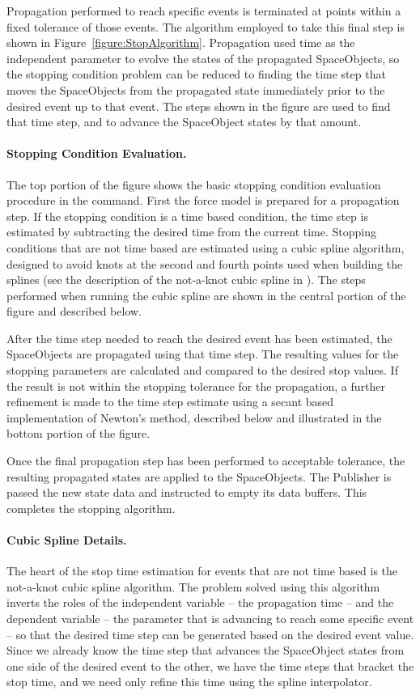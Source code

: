 Propagation performed to reach specific events is terminated at points within a fixed tolerance of
those events.  The algorithm employed to take this final step is shown in
Figure~\ref{figure:StopAlgorithm}.  Propagation used time as the independent parameter to evolve
the states of the propagated SpaceObjects, so the stopping condition problem can be reduced to
finding the time step that moves the SpaceObjects from the propagated state immediately prior to
the desired event up to that event.  The steps shown in the figure are used to find that time
step, and to advance the SpaceObject states by that amount.

\paragraph{Stopping Condition Evaluation.}  The top portion of the figure shows the basic stopping
condition evaluation procedure in the command.  First the force model is prepared for a propagation
step.  If the stopping condition is a time based condition, the time step is estimated by
subtracting the desired time from the current time.  Stopping conditions that are not time based are
estimated using a cubic spline algorithm, designed to avoid knots at the second and fourth points
used when building the splines (see the description of the not-a-knot cubic spline in
\cite{mathSpec}).  The steps performed when running the cubic spline are shown in the central
portion of the figure and described below.

After the time step needed to reach the desired event has been estimated, the SpaceObjects are
propagated using that time step.  The resulting values for the stopping parameters are calculated
and compared to the desired stop values.  If the result is not within the stopping tolerance for
the propagation, a further refinement is made to the time step estimate using a secant based
implementation of Newton's method, described below and illustrated in the bottom portion of the
figure.

Once the final propagation step has been performed to acceptable tolerance, the resulting
propagated states are applied to the SpaceObjects.  The Publisher is passed the new state data and
instructed to empty its data buffers.  This completes the stopping algorithm.

\paragraph{Cubic Spline Details.}  The heart of the stop time estimation for events that are not
time based is the not-a-knot cubic spline algorithm.  The problem solved using this algorithm
inverts the roles of the independent variable -- the propagation time -- and the dependent variable
-- the parameter that is advancing to reach some specific event -- so that the desired time step
can be generated based on the desired event value.  Since we already know the time step that
advances the SpaceObject states from one side of the desired event to the other, we have the time
steps that bracket the stop time, and we need only refine this time using the spline interpolator.


